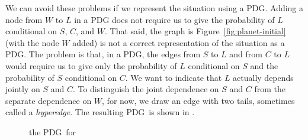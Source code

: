 \documentclass{article}
\newcommand{\MN}{PDG}
\numberwithin{equation}{section}
\begin{document}
\begin{example}
We can avoid these problems if we represent the situation using a
PDG.  Adding a node from $W$ to $L$ in a PDG does not require us to
give the probability of $L$ conditional on $S$, $C$, and $W$. That
said, the graph is Figure~\ref{fig:planet-initial} (with the node $W$
added) is not a correct representation of the situation as a PDG.  The
problem is that, in a PDG, the edges from $S$ to $L$ and from $C$ to
$L$ would require us to give only the probability of $L$ conditional
on $S$ and the probability of $S$ conditional on $C$.  We want to
indicate that $L$ actually depends jointly on $S$ and $C$.
To distinguish the joint dependence on
$S$ and $C$ from the separate dependence on $W$, for now, we draw an
edge with two tails, sometimes called a
\emph{hyperedge}. The resulting \MN\ is shown in
. 

		\begin{figure}
			\centering
			\caption{the \MN\ for }
			\label{fig:plannet-pdg}
		\end{figure}
	

\end{example}
\end{document}
